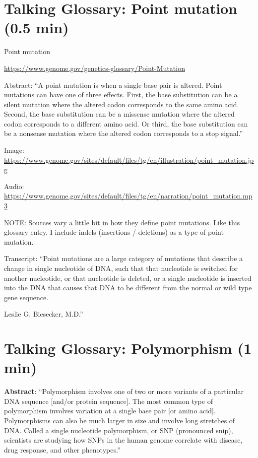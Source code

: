 \documentclass[
]{book}
\begin{document}
\hypertarget{talking-glossary-point-mutation-0.5-min}{%
\section{Talking Glossary: Point mutation (0.5 min)}\label{talking-glossary-point-mutation-0.5-min}}

Point mutation

\url{https://www.genome.gov/genetics-glossary/Point-Mutation}

Abstract: ``A point mutation is when a single base pair is altered. Point mutations can have one of three effects. First, the base substitution can be a silent mutation where the altered codon corresponds to the same amino acid. Second, the base substitution can be a missense mutation where the altered codon corresponds to a different amino acid. Or third, the base substitution can be a nonsense mutation where the altered codon corresponds to a stop signal.''

Image: \url{https://www.genome.gov/sites/default/files/tg/en/illustration/point_mutation.jpg}

Audio: \url{https://www.genome.gov/sites/default/files/tg/en/narration/point_mutation.mp3}

NOTE: Sources vary a little bit in how they define point mutations. Like this glossary entry, I include indels (insertions / deletions) as a type of point mutation.

Transcript:
``Point mutations are a large category of mutations that describe a change in single nucleotide of DNA, such that that nucleotide is switched for another nucleotide, or that nucleotide is deleted, or a single nucleotide is inserted into the DNA that causes that DNA to be different from the normal or wild type gene sequence.

Leslie G. Biesecker, M.D.''

\hypertarget{talking-glossary-polymorphism-1-min}{%
\section{Talking Glossary: Polymorphism (1 min)}\label{talking-glossary-polymorphism-1-min}}

\textbf{Abstract}: ``Polymorphism involves one of two or more variants of a particular DNA sequence {[}and/or protein sequence{]}. The most common type of polymorphism involves variation at a single base pair {[}or amino acid{]}. Polymorphisms can also be much larger in size and involve long stretches of DNA. Called a single nucleotide polymorphism, or SNP (pronounced snip), scientists are studying how SNPs in the human genome correlate with disease, drug response, and other phenotypes.''
\end{document}

